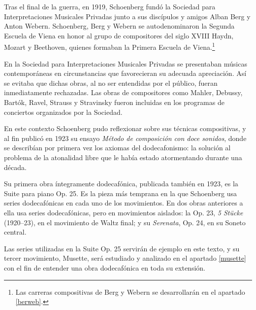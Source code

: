 		Tras el final de la guerra, en 1919, Schoenberg fundó la Sociedad para Interpretaciones Musicales Privadas junto a sus discípulos y amigos Alban Berg y Anton Webern. Schoenberg, Berg y Webern se autodenominaron la Segunda Escuela de Viena en honor al grupo de compositores del siglo XVIII Haydn, Mozart y Beethoven, quienes formaban la Primera Escuela de Viena.\footnote{Las carreras compositivas de Berg y Webern se desarrollarán en el apartado \ref{berweb}.}
		
		En la Sociedad para Interpretaciones Musicales Privadas se presentaban músicas contemporáneas en circunstancias que favorecieran su adecuada apreciación. Así se evitaba que dichas obras, al no ser entendidas por el público, fueran inmediatamente rechazadas. Las obras de compositores como Mahler, Debussy, Bartók, Ravel, Strauss y Stravinsky fueron incluidas en los programas de conciertos organizados por la Sociedad.
		
		En este contexto Schoenberg pudo reflexionar sobre sus técnicas compositivas, y al fin publicó en 1923 su ensayo \emph{Método de composición con doce sonidos}, donde se describían por primera vez los axiomas del dodecafonismo: la solución al problema de la atonalidad libre que le había estado atormentando durante una década.
		
		Su primera obra íntegramente dodecafónica, publicada también en 1923, es la Suite para piano Op. 25. Es la pieza más temprana en la que Schoenberg usa series dodecafónicas en cada uno de los movimientos. En dos obras anteriores a ella usa series dodecafónicas, pero en movimientos aislados: la Op. 23, \emph{5 Stücke} (1920--23), en el movimiento de Waltz final; y su \emph{Serenata}, Op. 24, en su Soneto central.
		
		Las series utilizadas en la Suite Op. 25 servirán de ejemplo en este texto, y su tercer movimiento, Musette, será estudiado y analizado en el apartado \ref{musette} con el fin de entender una obra dodecafónica en toda su extensión.